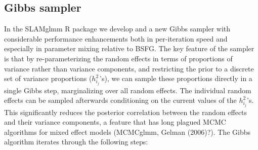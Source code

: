 \documentclass[11pt]{amsart}
\begin{document}
\subsection{Gibbs sampler}
\label{Gibbs_sampler}
In the SLAMglmm R package we develop and a new Gibbs sampler with considerable performance enhancements both in per-iteration speed and especially in parameter mixing relative to BSFG. The key feature of the sampler is that by re-parameterizing the random effects in terms of proportions of variance rather than variance components, and restricting the prior to a discrete set of variance proportions ($h^2_{i_j}$'s), we can sample these proportions directly in a single Gibbs step, marginalizing over all random effects. The individual random effects can be sampled afterwards conditioning on the current values of the $h^2_{i_j}$'s. This significantly reduces the posterior correlation between the random effects and their variance components, a feature that has long plagued MCMC algorithms for mixed effect models (MCMCglmm, Gelman (2006)?). The Gibbs algorithm iterates through the following steps:
\end{document}
